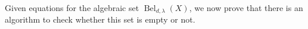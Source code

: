 \documentclass{amsproc}
\numberwithin{equation}{section}
\numberwithin{figure}{section}
\theoremstyle{definition}
\theoremstyle{remark}
\newcommand{\Qbar}{\overline{\mathbb{Q}}}
\newcommand{\p}{\mathbb{P}}
\DeclareMathOperator{\Bel}{Bel}
\newcommand{\Belyi}{Bely\u{\i}}
\begin{document}








Given equations for the algebraic set $\Bel_{d,\lambda}(X)$, we now prove that there is an algorithm to check whether this set is empty or not.
\end{document}
